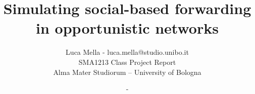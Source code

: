 \documentclass[a4paper]{article}
\begin{document}
\title{Simulating social-based forwarding in opportunistic networks}
\author{Luca Mella - luca.mella@studio.unibo.it \\ SMA1213 Class Project Report \\ Alma Mater Studiorum -- University of Bologna \\ }
\date{-}

\maketitle





\sloppy



\newpage


\newpage


\newpage


\newpage


\newpage


\newpage
\nocite{*}
{}
 
\end{document}
